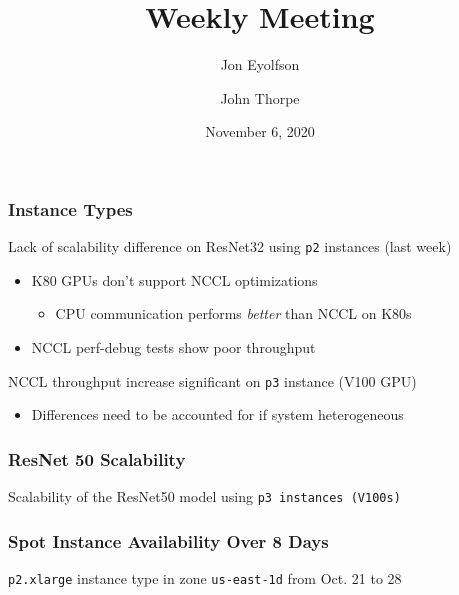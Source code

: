 

\title{Weekly Meeting}
\date{November 6, 2020}
\author{Jon Eyolfson \and John Thorpe}



  \begin{frame}[plain]
    \titlepage
  \end{frame}

  \setcounter{framenumber}{0}

  \begin{frame}
    \frametitle{Instance Types}

    Lack of scalability difference on ResNet32 using \texttt{p2} instances (last week)
    \begin{itemize}
      \item K80 GPUs don't support NCCL optimizations
      \begin{itemize}
        \item CPU communication performs \emph{better} than NCCL on K80s
      \end{itemize}
      \item NCCL perf-debug tests show poor throughput
    \end{itemize}

    \vspace{3em}
    NCCL throughput increase significant on \texttt{p3} instance (V100 GPU)
    \begin{itemize}
      \item Differences need to be accounted for if system heterogeneous
    \end{itemize}

  \end{frame}

  \begin{frame}
    \frametitle{ResNet 50 Scalability}

    \begin{center}
      
    \end{center}

    Scalability of the ResNet50 model using \texttt{p3 instances (V100s)}

  \end{frame}

  \begin{frame}
    \frametitle{Spot Instance Availability Over 8 Days}

    \begin{center}
      
    \end{center}

    \texttt{p2.xlarge} instance type in zone \texttt{us-east-1d} from
    Oct. 21 to 28
  \end{frame}

